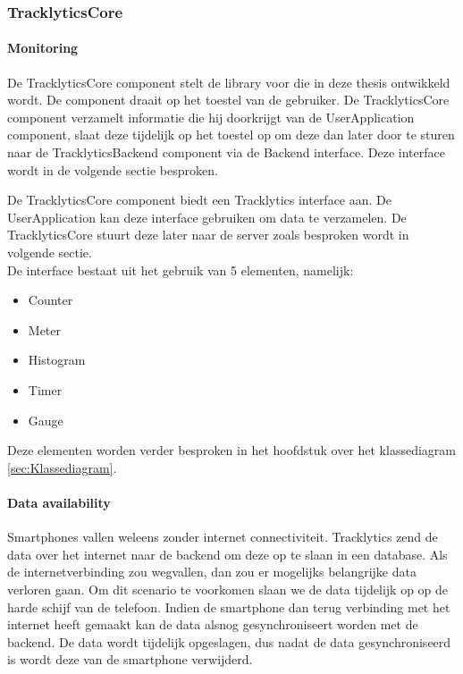 \subsubsection{TracklyticsCore}
\paragraph{Monitoring}
De TracklyticsCore component stelt de library voor die in deze thesis ontwikkeld wordt. De component draait op het toestel van de gebruiker. De TracklyticsCore component verzamelt informatie die hij doorkrijgt van de UserApplication component, slaat deze tijdelijk op het toestel op om deze dan later door te sturen naar de TracklyticsBackend component via de Backend interface. Deze interface wordt in de volgende sectie besproken.

De TracklyticsCore component biedt een Tracklytics interface aan. De UserApplication kan deze interface gebruiken om data te verzamelen. De TracklyticsCore stuurt deze later naar de server zoals besproken wordt in volgende sectie.\\

De interface bestaat uit het gebruik van 5 elementen, namelijk:
\begin{itemize}
\item Counter
\item Meter
\item Histogram
\item Timer
\item Gauge
\end{itemize}

Deze elementen worden verder besproken in het hoofdstuk over het klassediagram \ref{sec:Klassediagram}.\\

\paragraph{Data availability}
Smartphones vallen weleens zonder internet connectiviteit. Tracklytics zend de data over het internet naar de backend om deze op te slaan in een database. Als de internetverbinding zou wegvallen, dan zou er mogelijks belangrijke data verloren gaan. Om dit scenario te voorkomen slaan we de data tijdelijk op op de harde schijf van de telefoon. Indien de smartphone dan terug verbinding met het internet heeft gemaakt kan de data alsnog gesynchroniseert worden met de backend. De data wordt tijdelijk opgeslagen, dus nadat de data gesynchroniseerd is wordt deze van de smartphone verwijderd. 

